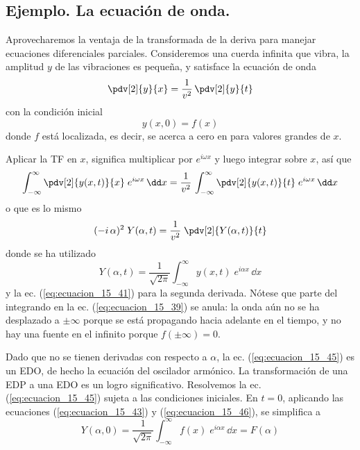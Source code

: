 \subsection*{Ejemplo. La ecuación de onda.}
Aprovecharemos la ventaja de la transformada de la deriva para manejar ecuaciones diferenciales parciales. Consideremos una cuerda infinita que vibra, la amplitud $y$ de las vibraciones es pequeña, y satisface la ecuación de onda
\begin{equation}
\pdv[2]{y}{x} = \dfrac{1}{v^{2}} \, \pdv[2]{y}{t}
\label{eq:ecuacion_15_42}
\end{equation}
con la condición inicial
\begin{equation}
y(x, 0) = f(x)
\label{eq:ecuacion_15_43}
\end{equation}
donde $f$ está localizada, es decir, se acerca a cero en para valores grandes de $x$.
\par
Aplicar la TF en $x$, significa multiplicar por $e^{i \omega x}$ y luego integrar sobre $x$, así que
\begin{equation}
\int_{-\infty}^{\infty} \pdv[2]{y(x, t)}{x} \; e^{i \omega x} \, \dd x = \dfrac{1}{v^{2}} \, \int_{-\infty}^{\infty} \pdv[2]{y (x, t)}{t} \; e^{i \omega x} \, \dd x
\label{eq:ecuacion_15_44}
\end{equation}
o que es lo mismo
\begin{equation}
(-i \, \alpha)^{2} \; Y(\alpha, t) = \dfrac{1}{v^{2}} \; \pdv[2]{Y(\alpha, t)}{t}
\label{eq:ecuacion_15_45}
\end{equation}
donde se ha utilizado
\begin{equation}
Y(\alpha, t) = \dfrac{1}{\sqrt{2 \pi}} \int_{-\infty}^{\infty} y(x, t) \; e^{i \alpha x} \, \dd x
\label{eq:ecuacion_15_46}
\end{equation}
y la ec. (\ref{eq:ecuacion_15_41}) para la segunda derivada. Nótese que parte del integrando en la ec. (\ref{eq:ecuacion_15_39}) se anula: la onda aún no se ha desplazado a $\pm \infty$ porque se está propagando hacia adelante en el tiempo, y no hay una fuente en el infinito porque $f(\pm \infty) = 0$.
\par
Dado que no se tienen derivadas con respecto a $\alpha$, la ec. (\ref{eq:ecuacion_15_45}) es un EDO, de hecho la ecuación del oscilador armónico. La transformación de una EDP a una EDO es un logro significativo. Resolvemos la ec. (\ref{eq:ecuacion_15_45}) sujeta a las condiciones iniciales. En $t=0$, aplicando las ecuaciones (\ref{eq:ecuacion_15_43}) y (\ref{eq:ecuacion_15_46}), se simplifica a
\begin{equation}
Y(\alpha, 0) = \dfrac{1}{\sqrt{2 \pi}} \int_{-\infty}^{\infty} f(x) \; e^{i \alpha x} \, \dd x =  F(\alpha)
\label{eq:ecuacion_15_47}
\end{equation}
